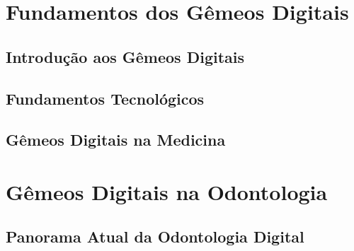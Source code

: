 \usepackage{lipsum}



\coverpage{\TITLE}{\SUBTITLE}{\AUTHOR}{\DATE}{\SUBJECT}
\newpage
\tableofcontents

\part{Fundamentos dos Gêmeos Digitais}
\newpage
\chapter{Introdução aos Gêmeos Digitais} \label{ch:introducao}


\newpage
\chapter{Fundamentos Tecnológicos} \label{ch:fundamentos}


\newpage
\chapter{Gêmeos Digitais na Medicina} \label{ch:medicina}


\part{Gêmeos Digitais na Odontologia}
\newpage
\chapter{Panorama Atual da Odontologia Digital} \label{ch:panorama}


